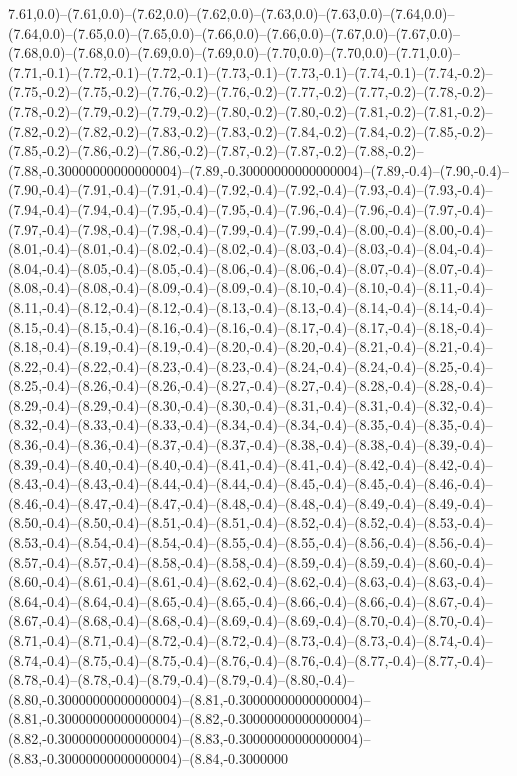7.61,0.0)--(7.61,0.0)--(7.62,0.0)--(7.62,0.0)--(7.63,0.0)--(7.63,0.0)--(7.64,0.0)--(7.64,0.0)--(7.65,0.0)--(7.65,0.0)--(7.66,0.0)--(7.66,0.0)--(7.67,0.0)--(7.67,0.0)--(7.68,0.0)--(7.68,0.0)--(7.69,0.0)--(7.69,0.0)--(7.70,0.0)--(7.70,0.0)--(7.71,0.0)--(7.71,-0.1)--(7.72,-0.1)--(7.72,-0.1)--(7.73,-0.1)--(7.73,-0.1)--(7.74,-0.1)--(7.74,-0.2)--(7.75,-0.2)--(7.75,-0.2)--(7.76,-0.2)--(7.76,-0.2)--(7.77,-0.2)--(7.77,-0.2)--(7.78,-0.2)--(7.78,-0.2)--(7.79,-0.2)--(7.79,-0.2)--(7.80,-0.2)--(7.80,-0.2)--(7.81,-0.2)--(7.81,-0.2)--(7.82,-0.2)--(7.82,-0.2)--(7.83,-0.2)--(7.83,-0.2)--(7.84,-0.2)--(7.84,-0.2)--(7.85,-0.2)--(7.85,-0.2)--(7.86,-0.2)--(7.86,-0.2)--(7.87,-0.2)--(7.87,-0.2)--(7.88,-0.2)--(7.88,-0.30000000000000004)--(7.89,-0.30000000000000004)--(7.89,-0.4)--(7.90,-0.4)--(7.90,-0.4)--(7.91,-0.4)--(7.91,-0.4)--(7.92,-0.4)--(7.92,-0.4)--(7.93,-0.4)--(7.93,-0.4)--(7.94,-0.4)--(7.94,-0.4)--(7.95,-0.4)--(7.95,-0.4)--(7.96,-0.4)--(7.96,-0.4)--(7.97,-0.4)--(7.97,-0.4)--(7.98,-0.4)--(7.98,-0.4)--(7.99,-0.4)--(7.99,-0.4)--(8.00,-0.4)--(8.00,-0.4)--(8.01,-0.4)--(8.01,-0.4)--(8.02,-0.4)--(8.02,-0.4)--(8.03,-0.4)--(8.03,-0.4)--(8.04,-0.4)--(8.04,-0.4)--(8.05,-0.4)--(8.05,-0.4)--(8.06,-0.4)--(8.06,-0.4)--(8.07,-0.4)--(8.07,-0.4)--(8.08,-0.4)--(8.08,-0.4)--(8.09,-0.4)--(8.09,-0.4)--(8.10,-0.4)--(8.10,-0.4)--(8.11,-0.4)--(8.11,-0.4)--(8.12,-0.4)--(8.12,-0.4)--(8.13,-0.4)--(8.13,-0.4)--(8.14,-0.4)--(8.14,-0.4)--(8.15,-0.4)--(8.15,-0.4)--(8.16,-0.4)--(8.16,-0.4)--(8.17,-0.4)--(8.17,-0.4)--(8.18,-0.4)--(8.18,-0.4)--(8.19,-0.4)--(8.19,-0.4)--(8.20,-0.4)--(8.20,-0.4)--(8.21,-0.4)--(8.21,-0.4)--(8.22,-0.4)--(8.22,-0.4)--(8.23,-0.4)--(8.23,-0.4)--(8.24,-0.4)--(8.24,-0.4)--(8.25,-0.4)--(8.25,-0.4)--(8.26,-0.4)--(8.26,-0.4)--(8.27,-0.4)--(8.27,-0.4)--(8.28,-0.4)--(8.28,-0.4)--(8.29,-0.4)--(8.29,-0.4)--(8.30,-0.4)--(8.30,-0.4)--(8.31,-0.4)--(8.31,-0.4)--(8.32,-0.4)--(8.32,-0.4)--(8.33,-0.4)--(8.33,-0.4)--(8.34,-0.4)--(8.34,-0.4)--(8.35,-0.4)--(8.35,-0.4)--(8.36,-0.4)--(8.36,-0.4)--(8.37,-0.4)--(8.37,-0.4)--(8.38,-0.4)--(8.38,-0.4)--(8.39,-0.4)--(8.39,-0.4)--(8.40,-0.4)--(8.40,-0.4)--(8.41,-0.4)--(8.41,-0.4)--(8.42,-0.4)--(8.42,-0.4)--(8.43,-0.4)--(8.43,-0.4)--(8.44,-0.4)--(8.44,-0.4)--(8.45,-0.4)--(8.45,-0.4)--(8.46,-0.4)--(8.46,-0.4)--(8.47,-0.4)--(8.47,-0.4)--(8.48,-0.4)--(8.48,-0.4)--(8.49,-0.4)--(8.49,-0.4)--(8.50,-0.4)--(8.50,-0.4)--(8.51,-0.4)--(8.51,-0.4)--(8.52,-0.4)--(8.52,-0.4)--(8.53,-0.4)--(8.53,-0.4)--(8.54,-0.4)--(8.54,-0.4)--(8.55,-0.4)--(8.55,-0.4)--(8.56,-0.4)--(8.56,-0.4)--(8.57,-0.4)--(8.57,-0.4)--(8.58,-0.4)--(8.58,-0.4)--(8.59,-0.4)--(8.59,-0.4)--(8.60,-0.4)--(8.60,-0.4)--(8.61,-0.4)--(8.61,-0.4)--(8.62,-0.4)--(8.62,-0.4)--(8.63,-0.4)--(8.63,-0.4)--(8.64,-0.4)--(8.64,-0.4)--(8.65,-0.4)--(8.65,-0.4)--(8.66,-0.4)--(8.66,-0.4)--(8.67,-0.4)--(8.67,-0.4)--(8.68,-0.4)--(8.68,-0.4)--(8.69,-0.4)--(8.69,-0.4)--(8.70,-0.4)--(8.70,-0.4)--(8.71,-0.4)--(8.71,-0.4)--(8.72,-0.4)--(8.72,-0.4)--(8.73,-0.4)--(8.73,-0.4)--(8.74,-0.4)--(8.74,-0.4)--(8.75,-0.4)--(8.75,-0.4)--(8.76,-0.4)--(8.76,-0.4)--(8.77,-0.4)--(8.77,-0.4)--(8.78,-0.4)--(8.78,-0.4)--(8.79,-0.4)--(8.79,-0.4)--(8.80,-0.4)--(8.80,-0.30000000000000004)--(8.81,-0.30000000000000004)--(8.81,-0.30000000000000004)--(8.82,-0.30000000000000004)--(8.82,-0.30000000000000004)--(8.83,-0.30000000000000004)--(8.83,-0.30000000000000004)--(8.84,-0.3000000